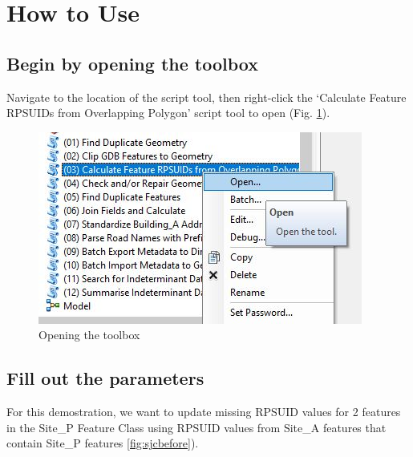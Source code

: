 \documentclass[openany]{book}
\theoremstyle{definition}
\theoremstyle{definition}
\theoremstyle{definition}
\theoremstyle{remark}
\begin{document}
\section{How to Use}\label{how-to-use-2}

\subsection{Begin by opening the
toolbox}\label{begin-by-opening-the-toolbox-2}

Navigate to the location of the script tool, then right-click the
`Calculate Feature RPSUIDs from Overlapping Polygon' script tool to open
(Fig. \ref{fig:sjcopentool}).

\begin{figure}[H]

\hfill{}\includegraphics{figures/spatjoinCalcopentool} 

\caption{Opening the toolbox}\label{fig:sjcopentool}
\end{figure}

\subsection{Fill out the parameters}\label{fill-out-the-parameters-2}

For this demostration, we want to update missing RPSUID values for 2
features in the Site\_P Feature Class using RPSUID values from Site\_A
features that contain Site\_P features \ref{fig:sjcbefore}).
\end{document}
